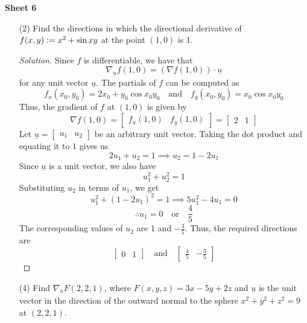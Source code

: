 \documentclass[12pt]{article}
\theoremstyle{definition}
\newenvironment{soln}{\begin{proof}[Solution]}{\end{proof}}
\begin{document}
\textbf{Sheet 6}
\begin{enumerate}[leftmargin=*]
    \itemsep0.5em
    \item[(2)] Find the directions in which the directional derivative of $f(x,y) \vcentcolon= x^2 + \sin{xy}$ at the point $(1,0)$ is $1$.
    
    \begin{soln}
        Since $f$ is differentiable, we have that
        \[
            \nabla_{\underline{u}}f(1,0) = \left( \nabla f(1,0) \right) \cdot \underline{u}
        \]
        for any unit vector $\underline{u}$. The partials of $f$ can be computed as
        \[
            f_x(x_0, y_0) = 2x_0 + y_0 \cos{x_0 y_0} \quad \text{and} \quad f_y(x_0, y_0) = x_0 \cos{x_0 y_0}
        \]
        Thus, the gradient of $f$ at $(1,0)$ is given by
        \[
            \nabla f(1,0) = \begin{bmatrix}
                f_x(1,0) & f_y(1,0)
            \end{bmatrix} = \begin{bmatrix}
                2 & 1
            \end{bmatrix}
        \]
        Let $\underline{u} = \begin{bmatrix} u_1 & u_2 \end{bmatrix}$ be an arbitrary unit vector. Taking the dot product and equating it to $1$ gives us
        \[
            2u_1 + u_2 = 1 \implies u_2 = 1 - 2u_1
        \]
        Since $\underline{u}$ is a unit vector, we also have
        \[
            u_1^2 + u_2^2 = 1
        \]
        Substituting $u_2$ in terms of $u_1$, we get
        \[
            u_1^2 + \left( 1 - 2u_1 \right)^2 = 1 \implies 5u_1^2 -4u_1 = 0
        \]
        \[
            \therefore u_1 = 0 \quad \text{or} \quad \frac{4}{5}
        \]
        The corresponding values of $u_2$ are $1$ and $-\frac{3}{5}$. Thus, the required directions are
        \[
            \begin{bmatrix}
                0 & 1
            \end{bmatrix} \quad \text{and} \quad 
            \begin{bmatrix}
                \frac{4}{5} & -\frac{3}{5}
            \end{bmatrix}
        \]
    \end{soln}
    
    \newpage
    
    \item[(4)] Find $\nabla_{\underline{u}} F(2,2,1)$, where $F(x,y,z) = 3x-5y+2z$ and $\underline{u}$ is the unit vector in the direction of the outward normal to the sphere $x^2 + y^2 + z^2 = 9$ at $(2,2,1)$.
    

\end{enumerate}
\end{document}
